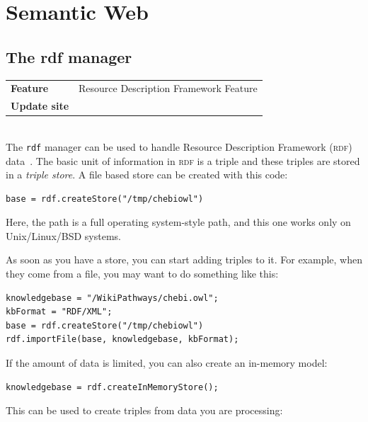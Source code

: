 \documentclass{book}
\begin{document}
\chapter{Semantic Web}
\begin{refsection}

\section{The rdf manager}

\begin{tabular}{ll}
\textbf{Feature} & Resource Description Framework Feature \\
\textbf{Update site} & \url{} \\
\end{tabular} \\

The \texttt{rdf} manager can be used to handle Resource Description
Framework (\textsc{rdf}) data~\cite{willighagen2011linking}.
The basic unit of information in \textsc{rdf} is a
triple and these triples are stored in a \emph{triple store}.
A file based store can be created with this code:

\begin{Verbatim}
base = rdf.createStore("/tmp/chebiowl")
\end{Verbatim}

Here, the path is a full operating system-style path, and this one
works only on Unix/Linux/BSD systems.

As soon as you have a store, you can start adding triples to it.
For example, when they come from a file, you may want to do
something like this:

\begin{Verbatim}
knowledgebase = "/WikiPathways/chebi.owl";
kbFormat = "RDF/XML";
base = rdf.createStore("/tmp/chebiowl")
rdf.importFile(base, knowledgebase, kbFormat);
\end{Verbatim}

If the amount of data is limited, you can also create an
in-memory model:

\begin{Verbatim}
knowledgebase = rdf.createInMemoryStore();
\end{Verbatim}

This can be used to create triples from data you are
processing:


\end{refsection}
\end{document}
